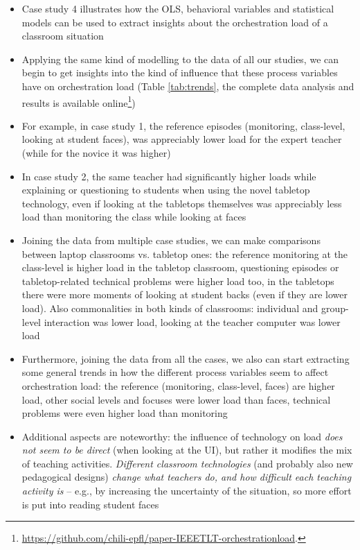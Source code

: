 \documentclass[10pt,journal,compsoc]{IEEEtran}
\begin{document}
\begin{itemize}
\item Case study 4 illustrates how the OLS, behavioral variables and statistical models can be used to extract insights about the orchestration load of a classroom situation
\item Applying the same kind of modelling to the data of all our studies, we can begin to get insights into the kind of influence that these process variables have on orchestration load (Table \ref{tab:trends}, the complete data analysis and results is available online\footnote{\href{https://github.com/chili-epfl/paper-IEEETLT-orchestrationload}{https://github.com/chili-epfl/paper-IEEETLT-orchestrationload}.}) 
\item For example, in case study 1, the reference episodes (monitoring, class-level, looking at student faces), was appreciably lower load for the expert teacher (while for the novice it was higher)
\item In case study 2, the same teacher had significantly higher loads while explaining or questioning to students when using the novel tabletop technology, even if looking at the tabletops themselves was appreciably less load than monitoring the class while looking at faces
\item Joining the data from multiple case studies, we can make comparisons between laptop classrooms vs. tabletop ones: the reference monitoring at the class-level is higher load in the tabletop classroom,  questioning episodes or tabletop-related technical problems were higher load too, in the tabletops there were more moments of looking at student backs (even if they are lower load). Also commonalities in both kinds of classrooms: individual and group-level interaction was lower load, looking at the teacher computer was lower load
\item Furthermore, joining the data from all the cases, we also can start extracting some general trends in how the different process variables seem to affect orchestration load: the reference (monitoring, class-level, faces) are higher load, other social levels and focuses were lower load than faces, technical problems were even higher load than monitoring
\item Additional aspects are noteworthy: the influence of technology on load \textit{does not seem to be direct} (when looking at the UI), but rather it modifies the mix of teaching activities. \textit{Different classroom technologies} (and probably also new pedagogical designs) \textit{change what teachers do, and how difficult each teaching activity is} -- e.g., by increasing the uncertainty of the situation, so more effort is put into reading student faces

\end{itemize}
\end{document}
